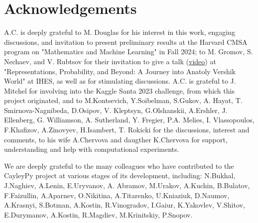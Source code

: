 \documentclass[reqno,11pt]{amsart}
\begin{document}
\section*{Acknowledgements}
A.C. is deeply grateful to M. Douglas for his interest in this work, engaging discussions, and invitation to present preliminary results at the Harvard CMSA program on "Mathematics and Machine Learning" in Fall 2024; to M. Gromov, S. Nechaev, and V. Rubtsov for their invitation to give a talk (\href{https://youtu.be/RkmBwlSyhfA?si=KgqQtRFaqx5ykd_s}{video}) at "Representations, Probability, and Beyond: A Journey into Anatoly Vershik World" at IHES, as well as for stimulating discussions. A.C. is grateful to J. Mitchel for involving into the Kaggle Santa 2023 challenge, from which this project originated, and to M.Kontsevich, Y.Soibelman,  S.Gukov, A. Hayat, T. Smirnova-Nagnibeda,  D.Osipov, V. Kleptsyn, G.Olshanskii, A.Ershler, J. Ellenberg, G. Williamson, A. Sutherland,  Y. Fregier, P.A. Melies, I. Vlassopoulos, F.Khafizov, A.Zinovyev, H.Isambert, T. Rokicki for the discussions, interest and comments, to his wife A.Chervova and daugther K.Chervova for support, understanding and help with computational experiments.  

We are deeply grateful to the many colleagues who have contributed to the CayleyPy project at various stages of its development, including: N.Bukhal, J.Naghiev, A.Lenin, E.Uryvanov,  A. Abramov, M.Urakov, A.Kuchin,  B.Bulatov,  F.Faizullin, A.Aparnev, O.Nikitina, A.Titarenko, U.Kniaziuk, D.Naumov, A.Krasnyi, S.Botman, A.Kostin,
R.Vinogradov, I.Gaiur, 
K.Yakovlev, V.Shitov, E.Durymanov, A.Kostin, R.Magdiev, M.Krinitskiy, P.Snopov. 
\end{document}
